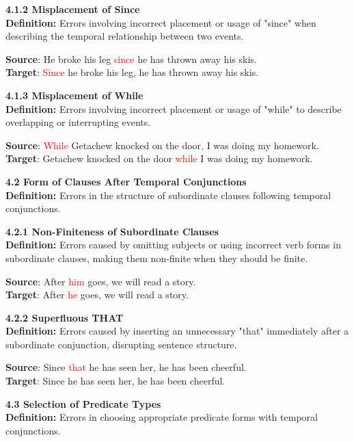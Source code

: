 \begin{tcolorbox}[breakable]
\noindent \textbf{4.1.2 Misplacement of Since}\\
\textbf{Definition:} Errors involving incorrect placement or usage of "since" when describing the temporal relationship between two events.


\textbf{Source}: He broke his leg \textcolor{red}{since} he has thrown away his skis. \\
\textbf{Target}: \textcolor{red}{Since} he broke his leg\textcolor{red}{,} he has thrown away his skis.


\noindent \textbf{4.1.3 Misplacement of While}\\
\textbf{Definition:} Errors involving incorrect placement or usage of "while" to describe overlapping or interrupting events.


\textbf{Source}: \textcolor{red}{While} Getachew knocked on the door\textcolor{red}{,} I was doing my homework. \\
\textbf{Target}: Getachew knocked on the door \textcolor{red}{while} I was doing my homework.


\noindent \textbf{4.2 Form of Clauses After Temporal Conjunctions}\\
\textbf{Definition:} Errors in the structure of subordinate clauses following temporal conjunctions.

\noindent \textbf{4.2.1 Non-Finiteness of Subordinate Clauses}\\
\textbf{Definition:} Errors caused by omitting subjects or using incorrect verb forms in subordinate clauses, making them non-finite when they should be finite.


\textbf{Source}: After \textcolor{red}{him} goes, we will read a story. \\
\textbf{Target}: After \textcolor{red}{he} goes, we will read a story.


\noindent \textbf{4.2.2 Superfluous THAT}\\
\textbf{Definition:} Errors caused by inserting an unnecessary "that" immediately after a subordinate conjunction, disrupting sentence structure.


\textbf{Source}: Since \textcolor{red}{that} he has seen her, he has been cheerful. \\
\textbf{Target}: Since he has seen her, he has been cheerful.


\noindent \textbf{4.3 Selection of Predicate Types}\\
\textbf{Definition:} Errors in choosing appropriate predicate forms with temporal conjunctions.


\end{tcolorbox}
